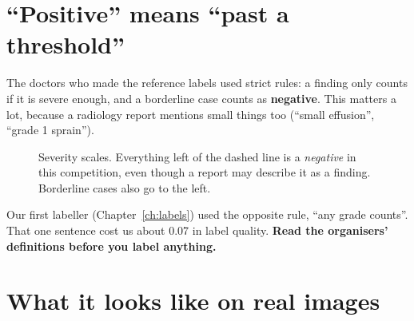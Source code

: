 \section{``Positive'' means ``past a threshold''}

The doctors who made the reference labels used strict rules: a finding only counts if it is severe enough,
and a borderline case counts as \textbf{negative}. This matters a lot, because a radiology report mentions
small things too (``small effusion'', ``grade 1 sprain'').

\begin{figure}[H]
\centering
{}
\caption{Severity scales. Everything left of the dashed line is a \emph{negative} in this competition, even
though a report may describe it as a finding. Borderline cases also go to the left.}
\label{fig:thresholds}
\end{figure}

\begin{watchout}
Our first labeller (Chapter~\ref{ch:labels}) used the opposite rule, ``any grade counts''. That one sentence cost
us about 0.07 in label quality. \textbf{Read the organisers' definitions before you label anything.}
\end{watchout}

\section{What it looks like on real images}


